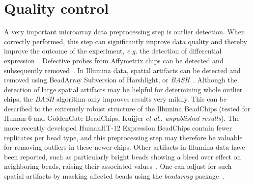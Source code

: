 \section{Quality control}\label{quality1}
A very important microarray data preprocessing step is outlier detection. When correctly performed, this step can significantly improve data quality and thereby improve the outcome of the experiment, {\it e.g.} the detection of differential expression~\cite{allison2006microarray,kauffmann2010microarray}. Defective probes from Affymetrix chips can be detected and subsequently removed~\cite{li2001model}. In Illumina data, spatial artifacts can be detected and removed using BeadArray Subversion of Harshlight, or {\it BASH}~\cite{cairns2008bash}. Although the detection of large spatial artifacts may be helpful for determining whole outlier chips, the {\it BASH} algorithm only improves results very mildly. This can be described to the extremely robust structure of the Illumina BeadChips (tested for Human-6 and GoldenGate BeadChips, Kuijjer {\it et al}., {\it unpublished results}). The more recently developed HumanHT-12 Expression BeadChips contain fewer replicates per bead type, and this preprocessing step may therefore be valuable for removing outliers in these newer chips. Other artifacts in Illumina data have been reported, such as particularly bright beads showing a bleed over effect on neighboring beads, raising their associated values~\cite{smith2010identification}. One can adjust for such spatial artifacts by masking affected beads using the {\it beadarray} package~\cite{dunning2007beadarray}.

